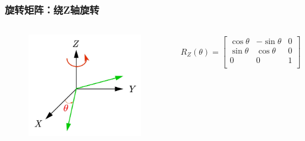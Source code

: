 \documentclass[aspectratio=43]{beamer}
\begin{document}
\begin{frame}
	\frametitle{旋转矩阵：绕Z轴旋转}
	\begin{columns}
		\column{5cm}
		\begin{figure}
			\begin{center}
				\includegraphics[scale=1]{旋转矩阵Z}
			\end{center}
		\end{figure}
		\column{6cm}
		\begin{gather}
			R_Z\left( \theta \right) =\left[ \begin{matrix}
				\cos \theta&		-\sin \theta&		0\\
				\sin \theta&		\cos \theta&		0\\
				0&		0&		1\\
			\end{matrix} \right] 	
		\end{gather}	
	\end{columns}
\end{frame}
\end{document}
